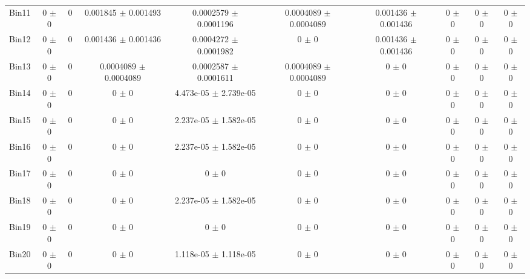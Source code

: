 \begin{tabular}{@{\extracolsep{4pt}}lccccccccc@{}}
     Bin11 & 0 $\pm$ 0 & 0 & 0.001845 $\pm$ 0.001493 & 0.0002579 $\pm$ 0.0001196 & 0.0004089 $\pm$ 0.0004089 & 0.001436 $\pm$ 0.001436 & 0 $\pm$ 0 & 0 $\pm$ 0 & 0 $\pm$ 0 \\ 
     Bin12 & 0 $\pm$ 0 & 0 & 0.001436 $\pm$ 0.001436 & 0.0004272 $\pm$ 0.0001982 & 0 $\pm$ 0 & 0.001436 $\pm$ 0.001436 & 0 $\pm$ 0 & 0 $\pm$ 0 & 0 $\pm$ 0 \\ 
     Bin13 & 0 $\pm$ 0 & 0 & 0.0004089 $\pm$ 0.0004089 & 0.0002587 $\pm$ 0.0001611 & 0.0004089 $\pm$ 0.0004089 & 0 $\pm$ 0 & 0 $\pm$ 0 & 0 $\pm$ 0 & 0 $\pm$ 0 \\ 
     Bin14 & 0 $\pm$ 0 & 0 & 0 $\pm$ 0 & 4.473e-05 $\pm$ 2.739e-05 & 0 $\pm$ 0 & 0 $\pm$ 0 & 0 $\pm$ 0 & 0 $\pm$ 0 & 0 $\pm$ 0 \\ 
     Bin15 & 0 $\pm$ 0 & 0 & 0 $\pm$ 0 & 2.237e-05 $\pm$ 1.582e-05 & 0 $\pm$ 0 & 0 $\pm$ 0 & 0 $\pm$ 0 & 0 $\pm$ 0 & 0 $\pm$ 0 \\ 
     Bin16 & 0 $\pm$ 0 & 0 & 0 $\pm$ 0 & 2.237e-05 $\pm$ 1.582e-05 & 0 $\pm$ 0 & 0 $\pm$ 0 & 0 $\pm$ 0 & 0 $\pm$ 0 & 0 $\pm$ 0 \\ 
     Bin17 & 0 $\pm$ 0 & 0 & 0 $\pm$ 0 & 0 $\pm$ 0 & 0 $\pm$ 0 & 0 $\pm$ 0 & 0 $\pm$ 0 & 0 $\pm$ 0 & 0 $\pm$ 0 \\ 
     Bin18 & 0 $\pm$ 0 & 0 & 0 $\pm$ 0 & 2.237e-05 $\pm$ 1.582e-05 & 0 $\pm$ 0 & 0 $\pm$ 0 & 0 $\pm$ 0 & 0 $\pm$ 0 & 0 $\pm$ 0 \\ 
     Bin19 & 0 $\pm$ 0 & 0 & 0 $\pm$ 0 & 0 $\pm$ 0 & 0 $\pm$ 0 & 0 $\pm$ 0 & 0 $\pm$ 0 & 0 $\pm$ 0 & 0 $\pm$ 0 \\ 
     Bin20 & 0 $\pm$ 0 & 0 & 0 $\pm$ 0 & 1.118e-05 $\pm$ 1.118e-05 & 0 $\pm$ 0 & 0 $\pm$ 0 & 0 $\pm$ 0 & 0 $\pm$ 0 & 0 $\pm$ 0 \\ 
\hline\hline
  \end{tabular}
